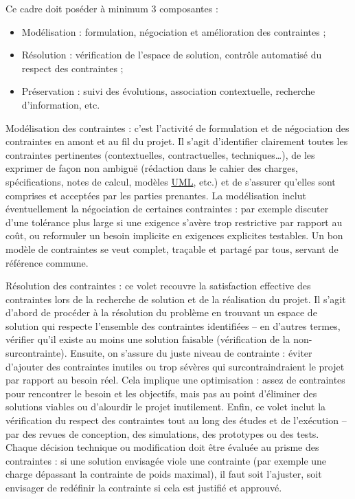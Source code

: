 \documentclass[a4paper,12pt]{article}
\begin{document}
Ce cadre doit poséder à minimum 3 composantes :
\begin{itemize}
\item Modélisation : formulation, négociation et amélioration des contraintes ;
\item Résolution : vérification de l'espace de solution, contrôle automatisé du respect des contraintes ;
\item Préservation : suivi des évolutions, association contextuelle, recherche d'information, etc.
\end{itemize}

Modélisation des contraintes : c’est l’activité de formulation et de négociation des contraintes en amont et au fil du projet. Il s’agit d’identifier clairement toutes les contraintes pertinentes (contextuelles, contractuelles, techniques…), de les exprimer de façon non ambiguë (rédaction dans le cahier des charges, spécifications, notes de calcul, modèles \protect\hyperlink{gls-2}{\label{gls-2-use-2}UML}, etc.) et de s’assurer qu’elles sont comprises et acceptées par les parties prenantes. La modélisation inclut éventuellement la négociation de certaines contraintes : par exemple discuter d’une tolérance plus large si une exigence s’avère trop restrictive par rapport au coût, ou reformuler un besoin implicite en exigences explicites testables. Un bon modèle de contraintes se veut complet, traçable et partagé par tous, servant de référence commune.

Résolution des contraintes : ce volet recouvre la satisfaction effective des contraintes lors de la recherche de solution et de la réalisation du projet. Il s’agit d’abord de procéder à la résolution du problème en trouvant un espace de solution qui respecte l’ensemble des contraintes identifiées – en d’autres termes, vérifier qu’il existe au moins une solution faisable (vérification de la non-surcontrainte). Ensuite, on s’assure du juste niveau de contrainte : éviter d’ajouter des contraintes inutiles ou trop sévères qui surcontraindraient le projet par rapport au besoin réel. Cela implique une optimisation : assez de contraintes pour rencontrer le besoin et les objectifs, mais pas au point d’éliminer des solutions viables ou d’alourdir le projet inutilement. Enfin, ce volet inclut la vérification du respect des contraintes tout au long des études et de l’exécution – par des revues de conception, des simulations, des prototypes ou des tests. Chaque décision technique ou modification doit être évaluée au prisme des contraintes : si une solution envisagée viole une contrainte (par exemple une charge dépassant la contrainte de poids maximal), il faut soit l’ajuster, soit envisager de redéfinir la contrainte si cela est justifié et approuvé.
\end{document}
